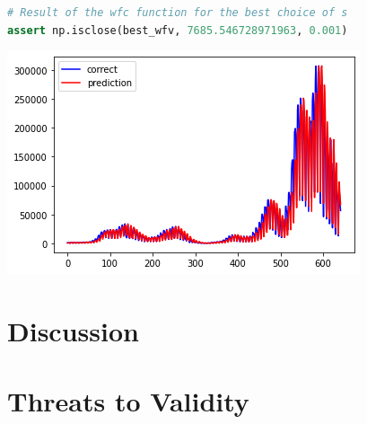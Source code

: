 \documentclass[acmsmall,screen,review,anonymous]{acmart}
\begin{document}

\begin{minipage}{0.5\textwidth}
  \begin{lstlisting}[language=Python]
# Result of the wfc function for the best choice of s
assert np.isclose(best_wfv, 7685.546728971963, 0.001)
  \end{lstlisting}
\end{minipage}
\begin{minipage}{0.5\textwidth}
  \includegraphics[width=\linewidth]{../catalogue/select-117b.png}
\end{minipage}

\section{Discussion}\label{sec:discuss}



\section{Threats to Validity}\label{sec:threats}
\end{document}
